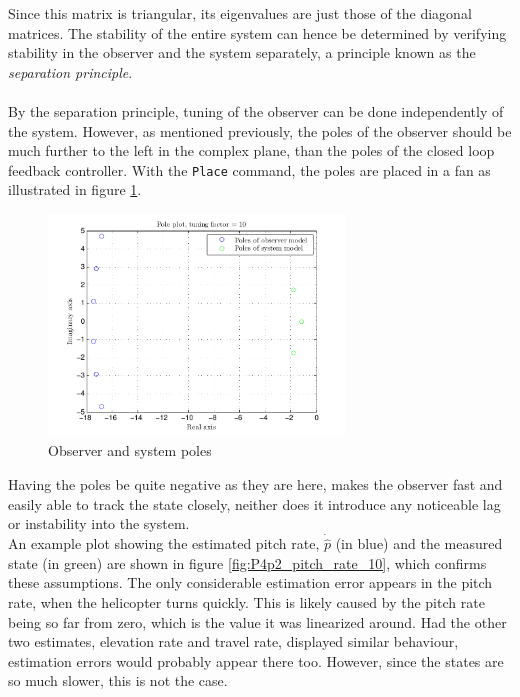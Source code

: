 Since this matrix is triangular, its eigenvalues are just those of the diagonal matrices. The stability of the entire system can hence be determined by verifying stability in the observer and the system separately, a principle known as the \textit{separation principle}. \cite{StackExchange}  \\
\\
By the separation principle, tuning of the observer can be done independently of the system. However, as mentioned previously, the poles of the observer should be much further to the left in the complex plane, than the poles of the closed loop feedback controller. With the \texttt{Place} command, the poles are placed in a fan as illustrated in figure \ref{fig:P4p2_observer_poles}.
\begin{figure}[htb]
	\centering
		\includegraphics[width=0.7\textwidth,trim={0cm 0cm 0cm 0cm},clip]{figures/P4p2_pole_plot_tuning_factor_10.pdf}
	\caption{Observer and system poles}
\label{fig:P4p2_observer_poles}
\end{figure}
Having the poles be quite negative as they are here, makes the observer fast and easily able to track the state closely, neither does it introduce any noticeable lag or instability into the system. \\
An example plot showing the estimated pitch rate, $\dot{\hat{p}}$ (in blue) and the measured state (in green) are shown in figure \ref{fig:P4p2_pitch_rate_10}, which confirms these assumptions. The only considerable estimation error appears in the pitch rate, when the helicopter turns quickly. This is likely caused by the pitch rate being so far from zero, which is the value it was linearized around. Had the other two estimates, elevation rate and travel rate, displayed similar behaviour, estimation errors would probably appear there too. However, since the states are so much slower, this is not the case.\\
